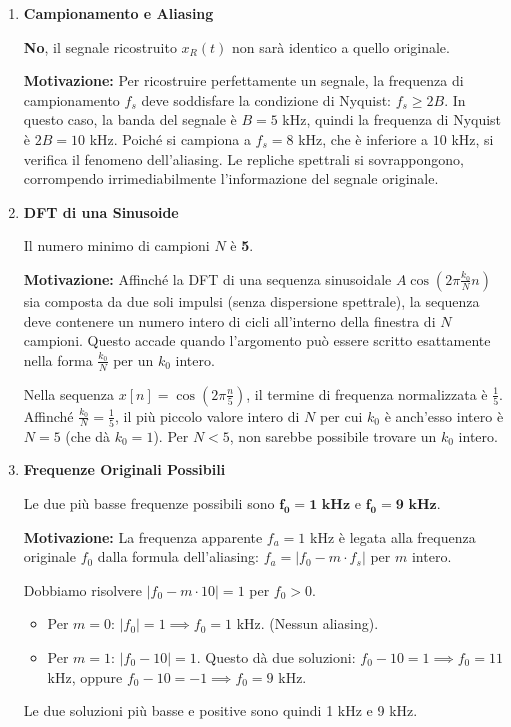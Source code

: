 
\begin{soluzione}{25}
    \begin{enumerate}
        \item \textbf{Campionamento e Aliasing}
        
        \textbf{No}, il segnale ricostruito $x_R(t)$ non sarà identico a quello originale.
        
        \textbf{Motivazione:} Per ricostruire perfettamente un segnale, la frequenza di campionamento $f_s$ deve soddisfare la condizione di Nyquist: $f_s \ge 2B$. In questo caso, la banda del segnale è $B=5$ kHz, quindi la frequenza di Nyquist è $2B = 10$ kHz. Poiché si campiona a $f_s = 8$ kHz, che è inferiore a $10$ kHz, si verifica il fenomeno dell'aliasing. Le repliche spettrali si sovrappongono, corrompendo irrimediabilmente l'informazione del segnale originale.

        \item \textbf{DFT di una Sinusoide}
        
        Il numero minimo di campioni $N$ è \textbf{5}.
        
        \textbf{Motivazione:} Affinché la DFT di una sequenza sinusoidale $A\cos(2\pi \frac{k_0}{N}n)$ sia composta da due soli impulsi (senza dispersione spettrale), la sequenza deve contenere un numero intero di cicli all'interno della finestra di $N$ campioni. Questo accade quando l'argomento può essere scritto esattamente nella forma $\frac{k_0}{N}$ per un $k_0$ intero.
        
        Nella sequenza $x[n] = \cos(2\pi \frac{n}{5})$, il termine di frequenza normalizzata è $\frac{1}{5}$. Affinché $\frac{k_0}{N} = \frac{1}{5}$, il più piccolo valore intero di $N$ per cui $k_0$ è anch'esso intero è $N=5$ (che dà $k_0=1$). Per $N<5$, non sarebbe possibile trovare un $k_0$ intero.

        \item \textbf{Frequenze Originali Possibili}
        
        Le due più basse frequenze possibili sono $\mathbf{f_0 = 1 \text{ kHz}}$ e $\mathbf{f_0 = 9 \text{ kHz}}$.
        
        \textbf{Motivazione:} La frequenza apparente $f_a = 1$ kHz è legata alla frequenza originale $f_0$ dalla formula dell'aliasing: $f_a = |f_0 - m \cdot f_s|$ per $m$ intero.
        
        Dobbiamo risolvere $|f_0 - m \cdot 10| = 1$ per $f_0 > 0$.
        \begin{itemize}
            \item Per $m=0$: $|f_0| = 1 \implies f_0 = 1$ kHz. (Nessun aliasing).
            \item Per $m=1$: $|f_0 - 10| = 1$. Questo dà due soluzioni: $f_0 - 10 = 1 \implies f_0 = 11$ kHz, oppure $f_0 - 10 = -1 \implies f_0 = 9$ kHz.
        \end{itemize}
        Le due soluzioni più basse e positive sono quindi 1 kHz e 9 kHz.
        

\end{enumerate}
\end{soluzione}
